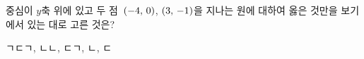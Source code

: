 중심이 $y$축 위에 있고 두 점~$(-4,\mkern3mu 0)$, $(3,\mkern3mu -1)$을 지나는 원에 대하여 옳은 것만을 보기에서 있는 대로 고른 것은?
\begin{choices32}{ㄱ}{ㄷ}{ㄱ, ㄴ}{ㄴ, ㄷ}{ㄱ, ㄴ, ㄷ}\end{choices32}
